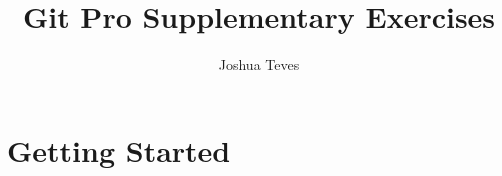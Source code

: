 \documentclass{report}
\title{Git Pro Supplementary Exercises}
\author{Joshua Teves}
\begin{document}
\maketitle

\chapter{Getting Started}

\end{document}

